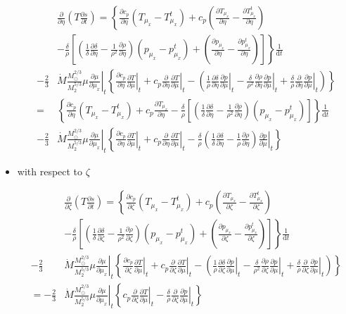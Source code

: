 \documentclass[12pt,a4paper]{article}
\newcommand{\pfird}[2][]{\frac{\partial#1}{\partial#2}}
\newcommand{\dd}[1]{\mathrm{d}#1}
\begin{document}
\begin{itemize}
  \begin{align}
    &\pfird[]{\eta}\left(T\pfird[s]{t}\right) = \left\{\pfird[c_p]{\eta}\left(T_{\mu_x} - T_{\mu_x}^t\right) + c_p\left(\pfird[T_{\mu_x}]{\eta} - \pfird[T_{\mu_x}^t]{\eta}\right)\right.\nonumber\\
    &\left.- \frac{\delta}{\rho}\left[\left(\frac{1}{\delta}\pfird[\delta]{\eta} - \frac{1}{\rho^2}\pfird[\rho]{\eta}\right)\left(p_{\mu_x} - p_{\mu_x}^t\right)  + \left(\pfird[p_{\mu_x}]{\eta} - \pfird[p_{\mu_x}^t]{\eta}\right)\right]\right\}\frac{1}{\dd{t}}\nonumber\\
    -\frac{2}{3}&\dot{M}\frac{M_\odot^{2/3}}{M_2^{5/3}}\mu\left.\pfird[\mu]{\mu_x}\right|_t\left\{\pfird[c_p]{\eta}\left.\pfird[T]{\mu}\right|_t + c_p\pfird[]{\eta}\left.\pfird[T]{\mu}\right|_t - \left(\frac{1}{\rho}\pfird[\delta]{\eta}\left.\pfird[p]{\mu}\right|_t - \frac{\delta}{\rho^2}\pfird[\rho]{\eta}\left.\pfird[p]{\mu}\right|_t + \frac{\delta}{\rho}\pfird[]{\eta}\left.\pfird[p]{\mu}\right|_t\right)\right\}\nonumber\\
    =&\left\{\pfird[c_p]{\eta}\left(T_{\mu_x} - T_{\mu_x}^t\right) + c_p\pfird[T_{\mu_x}]{\eta} - \frac{\delta}{\rho}\left[\left(\frac{1}{\delta}\pfird[\delta]{\eta} - \frac{1}{\rho^2}\pfird[\rho]{\eta}\right)\left(p_{\mu_x} - p_{\mu_x}^t\right)  \right]\right\}\frac{1}{\dd{t}}\nonumber\\
    -\frac{2}{3}&\dot{M}\frac{M_\odot^{2/3}}{M_2^{5/3}}\mu\left.\pfird[\mu]{\mu_x}\right|_t\left\{\pfird[c_p]{\eta}\left.\pfird[T]{\mu}\right|_t + c_p\pfird[]{\eta}\left.\pfird[T]{\mu}\right|_t - \frac{\delta}{\rho}\left(\frac{1}{\delta}\pfird[\delta]{\eta} - \frac{1}{\rho}\pfird[\rho]{\eta}\right)\left.\pfird[p]{\mu}\right|_t\right\}
  \end{align}

  \item with respect to $\zeta$

  \begin{align}
    &\pfird[]{\zeta}\left(T\pfird[s]{t}\right) = \left\{\pfird[c_p]{\zeta}\left(T_{\mu_x} - T_{\mu_x}^t\right) + c_p\left(\pfird[T_{\mu_x}]{\zeta} - \pfird[T_{\mu_x}^t]{\zeta}\right)\right.\nonumber\\
    &\left.- \frac{\delta}{\rho}\left[\left(\frac{1}{\delta}\pfird[\delta]{\zeta} - \frac{1}{\rho^2}\pfird[\rho]{\zeta}\right)\left(p_{\mu_x} - p_{\mu_x}^t\right)  + \left(\pfird[p_{\mu_x}]{\zeta} - \pfird[p_{\mu_x}^t]{\zeta}\right)\right]\right\}\frac{1}{\dd{t}}\nonumber\\
    -\frac{2}{3}&\dot{M}\frac{M_\odot^{2/3}}{M_2^{5/3}}\mu\left.\pfird[\mu]{\mu_x}\right|_t\left\{\pfird[c_p]{\zeta}\left.\pfird[T]{\mu}\right|_t + c_p\pfird[]{\zeta}\left.\pfird[T]{\mu}\right|_t - \left(\frac{1}{\rho}\pfird[\delta]{\zeta}\left.\pfird[p]{\mu}\right|_t - \frac{\delta}{\rho^2}\pfird[\rho]{\zeta}\left.\pfird[p]{\mu}\right|_t + \frac{\delta}{\rho}\pfird[]{\zeta}\left.\pfird[p]{\mu}\right|_t\right)\right\}\nonumber\\
    = -\frac{2}{3}&\dot{M}\frac{M_\odot^{2/3}}{M_2^{5/3}}\mu\left.\pfird[\mu]{\mu_x}\right|_t\left\{c_p\pfird[]{\zeta}\left.\pfird[T]{\mu}\right|_t - \frac{\delta}{\rho}\pfird[]{\zeta}\left.\pfird[p]{\mu}\right|_t\right\}
  \end{align}


\end{itemize}
\end{document}
